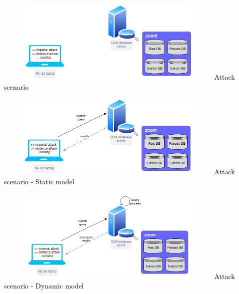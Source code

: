 \documentclass{fancyslides}
\begin{document}

\begin{frame}
\begin{center}
\includegraphics[width=11cm, height=4cm]{attack03.png}
\textcolor{black}{Attack scenario}
\end{center}
\end{frame}


\begin{frame}
\begin{center}
\includegraphics[width=11cm, height=4cm]{attack2.png}
\textcolor{black}{Attack scenario - Static model}
\end{center}
\end{frame}


\begin{frame}
\begin{center}
\includegraphics[width=11cm, height=4.5cm]{attack_dynamic.png}
\textcolor{black}{Attack scenario - Dynamic model}
\end{center}
\end{frame}
\end{document}
